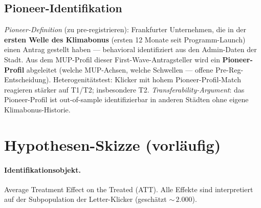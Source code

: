 \documentclass[11pt, a4paper]{scrartcl}
\begin{document}
\subsection{Pioneer-Identifikation}

\emph{Pioneer-Definition} (zu pre-registrieren): Frankfurter Unternehmen,
die in der \textbf{ersten Welle des Klimabonus} (ersten 12 Monate seit
Programm-Launch) einen Antrag gestellt haben --- behavioral identifiziert
aus den Admin-Daten der Stadt. Aus dem MUP-Profil dieser
First-Wave-Antragsteller wird ein \textbf{Pioneer-Profil} abgeleitet
(welche MUP-Achsen, welche Schwellen --- offene Pre-Reg-Entscheidung).
Heterogenitätstest: Klicker mit hohem Pioneer-Profil-Match reagieren
stärker auf T1/T2; insbesondere T2. \emph{Transferability-Argument}: das
Pioneer-Profil ist out-of-sample identifizierbar in anderen Städten ohne
eigene Klimabonus-Historie.

\section{Hypothesen-Skizze (vorläufig)}

\paragraph{Identifikationsobjekt.} Average Treatment Effect on the Treated
(ATT). Alle Effekte sind interpretiert auf der Subpopulation der
Letter-Klicker (geschätzt ${\sim}\,2.000$).
\end{document}
